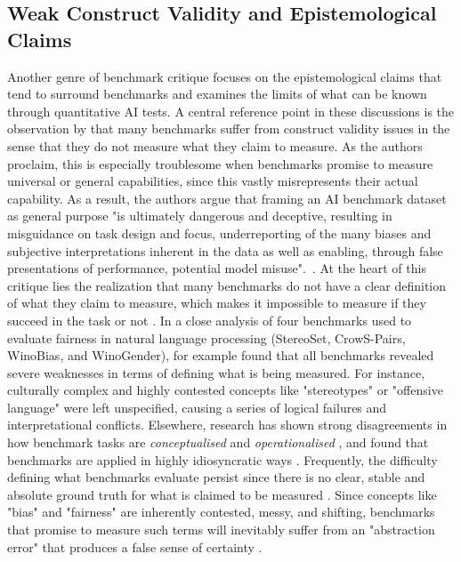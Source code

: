 \subsection{Weak Construct Validity and Epistemological Claims}

Another genre of benchmark critique focuses on the epistemological claims that tend to surround benchmarks and examines the limits of what can be known through quantitative AI tests. A central reference point in these discussions is the observation by \citet{raji2021} that many benchmarks suffer from construct validity issues in the sense that they do not measure what they claim to measure. As the authors proclaim, this is especially troublesome when benchmarks promise to measure universal or general capabilities, since this vastly misrepresents their actual capability. As a result, the authors argue that framing an AI benchmark dataset as general purpose "is ultimately dangerous and deceptive, resulting in misguidance on task design and focus, underreporting of the many biases and subjective interpretations inherent in the data as well as enabling, through false presentations of performance, potential model misuse".~\cite[p.~5]{raji2021}. At the heart of this critique lies the realization that many benchmarks do not have a clear definition of what they claim to measure, which makes it impossible to measure if they succeed in the task or not \cite{blodgett2021, bartz-beielstein2020}. In a close analysis of four benchmarks used to evaluate fairness in natural language processing (StereoSet, CrowS-Pairs, WinoBias, and WinoGender), \citet{blodgett2021} for example found that all benchmarks revealed severe weaknesses in terms of defining what is being measured. For instance, culturally complex and highly contested concepts like "stereotypes" or "offensive language" were left unspecified, causing a series of logical failures and interpretational conflicts. Elsewhere, research has shown strong disagreements in how benchmark tasks are \textit{conceptualised} and \textit{operationalised }\cite{subramonian2023}, and found that benchmarks are applied in highly idiosyncratic ways \cite{rottger2024}. Frequently, the difficulty defining what benchmarks evaluate persist since there is no clear, stable and absolute ground truth for what is claimed to be measured \cite{narayanan2023}. Since concepts like "bias" and "fairness" are inherently contested, messy, and shifting, benchmarks that promise to measure such terms will inevitably suffer from an "abstraction error" that produces a false sense of certainty \cite[p.~63]{selbst2019}. 

